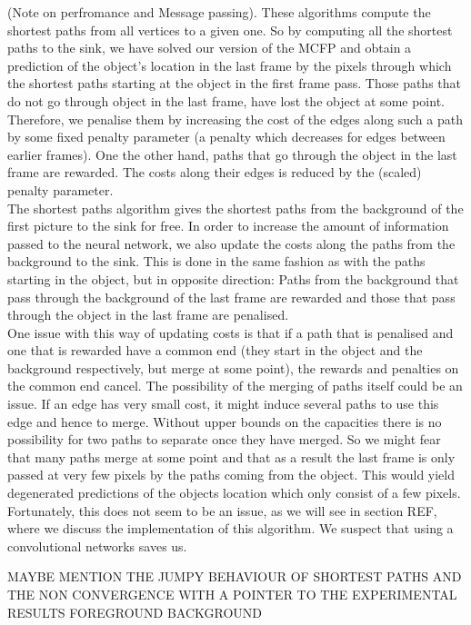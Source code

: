 \documentclass{article}
\begin{document}
(Note on perfromance and Message passing). These algorithms compute the shortest paths from all vertices to a given one. So by computing all the shortest paths to the sink, we have solved our version of the MCFP and obtain a prediction of the object's location in the last frame by the pixels through which the shortest paths starting at the object in the first frame pass. Those paths that do not go through object in the last frame, have lost the object at some point. Therefore, we penalise them by increasing the cost of the edges along such a path by some fixed penalty parameter (a penalty which decreases for edges between earlier frames). One the other hand, paths that go through the object in the last frame are rewarded. The costs along their edges is reduced by the (scaled) penalty parameter.\\
The shortest paths algorithm gives the shortest paths from the background of the first picture to the sink for free. In order to increase the amount of information passed to the neural network, we also update the costs along the paths from the background to the sink. This is done in the same fashion as with the paths starting in the object, but in opposite direction: Paths from the background that pass through the background of the last frame are rewarded and those that pass through the object in the last frame are penalised.\\
One issue with this way of updating costs is that if a path that is penalised and one that is rewarded have a common end (they start in the object and the background respectively, but merge at some point), the rewards and penalties on the common end cancel. The possibility of the merging of paths itself could be an issue. If an edge has very small cost, it might induce several paths to use this edge and hence to merge. Without upper bounds on the capacities there is no possibility for two paths to separate once they have merged. So we might fear that  many paths merge at some point and that as a result the last frame is only passed at very few pixels by the paths coming from the object. This would yield degenerated predictions of the objects location which only consist of a few pixels. Fortunately, this does not seem to be an issue, as we will see in section REF, where we discuss the implementation of this algorithm. We suspect that using a convolutional networks saves us.


MAYBE MENTION THE JUMPY BEHAVIOUR OF SHORTEST PATHS AND THE NON CONVERGENCE WITH A POINTER TO THE EXPERIMENTAL RESULTS
FOREGROUND BACKGROUND
\end{document}
